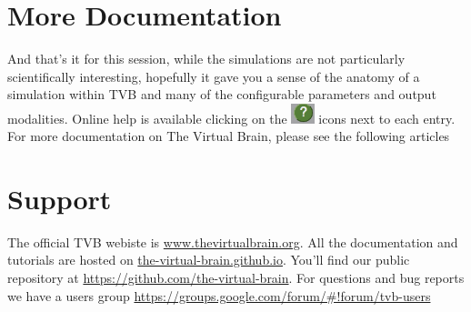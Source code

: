 \documentclass{tufte-handout}
\begin{document}
\section{More Documentation}\label{sec:more-doc}
And that's it for this session, while the simulations are not particularly scientifically
interesting, hopefully it gave you a sense of the anatomy of a
simulation within TVB and many of the configurable parameters and output
modalities. Online help is available clicking on the \includegraphics[width=0.05\textwidth]{butt_green_help} icons next to each entry.
For more documentation on The Virtual Brain, please see the following articles \citep{Ghosh_2008, Sanz-Leon_2013, Spiegler_2013, Woodman_2014, Jirsa_2010b}


\section{Support}\label{sec:support}

The official TVB webiste is \url{www.thevirtualbrain.org}.  
All the documentation and tutorials are hosted on \url{the-virtual-brain.github.io}.
You'll find our public  repository at \url{https://github.com/the-virtual-brain}. 
For questions and bug reports we have a users group \url{https://groups.google.com/forum/#!forum/tvb-users}



\end{document}
